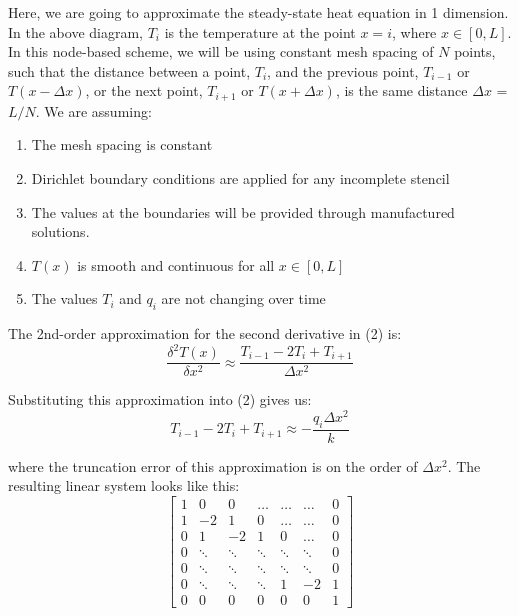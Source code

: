 \documentclass[letterpaper, 12pt]{article}
\begin{document}
\begin{flushleft}
\begin{tikzpicture}[
dot/.style = {circle, fill=black,inner sep=1pt, minimum size=4pt,label={#1},name=#1},
every label/.append style = {inner sep=1pt},thick]
\end{tikzpicture}

Here, we are going to approximate the steady-state heat equation in 1 dimension. In the above diagram, ${T_{i}}$ is the temperature at the point $x=i$, where $x \in [0,L]$. In this node-based scheme, we will be using constant mesh spacing of $N$ points, such that the distance between a point, $T_i$, and the previous point, $T_{i-1}$ or $T(x - \Delta x)$, or the next point, $T_{i+1}$ or $T(x + \Delta x)$, is the same distance $\Delta x$ = $L/N$.
\vskip 15mm
We are assuming:
\begin{enumerate}
    \item The mesh spacing is constant
    \item Dirichlet boundary conditions are applied for any incomplete stencil
    \item The values at the boundaries will be provided through manufactured solutions. 
    \item $T(x)$ is smooth and continuous for all $x \in [0,L]$
    \item The values $T_i$ and $q_i$ are not changing over time
\end{enumerate}


The 2nd-order approximation for the second derivative in (2) is:
\begin{equation}
    \frac{\delta^2 T(x)}{\delta x^2} \approx \frac{T_{i-1} - 2T_i + T_{i+1}}{\Delta x^2}
\end{equation}

Substituting this approximation into (2) gives us:
\begin{equation}
    T_{i-1} - 2T_i + T_{i+1} \approx - \frac{q_i \Delta x^2}{k}
\end{equation}

where the truncation error of this approximation is on the order of $\Delta x^2$. The resulting linear system looks like this:
\[
\begin{bmatrix}
    1 & 0 & 0 & \hdots & \hdots & \hdots & 0\\
    1 & -2 & 1 & 0 & \hdots & \hdots & 0\\
    0 & 1 & -2 & 1 & 0 & \hdots & 0\\
    0 & \ddots & \ddots & \ddots & \ddots & \ddots &  0\\
    0 & \ddots & \ddots & \ddots & \ddots & \ddots &  0\\
    0 & \ddots & \ddots & \ddots & 1 & -2 & 1 \\
    0 & 0 & 0 & 0 & 0 & 0 & 1
    

\end{bmatrix}\]
\end{flushleft}
\end{document}

